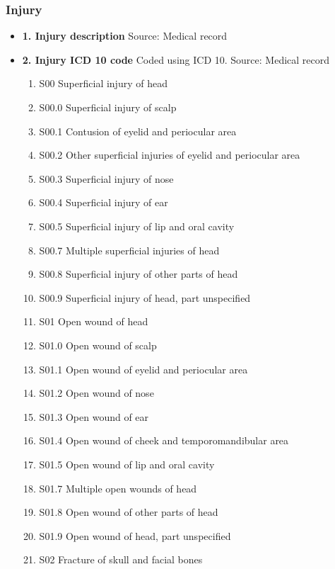 \documentclass[
]{scrartcl}
\providecommand{\tightlist}{%
  \setlength{\itemsep}{0pt}\setlength{\parskip}{0pt}}\usepackage{longtable,booktabs,array}
\begin{document}
\hypertarget{injury}{%
\subsubsection{Injury}\label{injury}}

\begin{itemize}
\item
  \textbf{1. Injury description} Source: Medical record
\item
  \textbf{2. Injury ICD 10 code} Coded using ICD 10. Source: Medical
  record

  \begin{enumerate}
  \def\labelenumi{\arabic{enumi}.}
  \tightlist
  \item
    S00 Superficial injury of head
  \item
    S00.0 Superficial injury of scalp
  \item
    S00.1 Contusion of eyelid and periocular area
  \item
    S00.2 Other superficial injuries of eyelid and periocular area
  \item
    S00.3 Superficial injury of nose
  \item
    S00.4 Superficial injury of ear
  \item
    S00.5 Superficial injury of lip and oral cavity
  \item
    S00.7 Multiple superficial injuries of head
  \item
    S00.8 Superficial injury of other parts of head
  \item
    S00.9 Superficial injury of head, part unspecified
  \item
    S01 Open wound of head
  \item
    S01.0 Open wound of scalp
  \item
    S01.1 Open wound of eyelid and periocular area
  \item
    S01.2 Open wound of nose
  \item
    S01.3 Open wound of ear
  \item
    S01.4 Open wound of cheek and temporomandibular area
  \item
    S01.5 Open wound of lip and oral cavity
  \item
    S01.7 Multiple open wounds of head
  \item
    S01.8 Open wound of other parts of head
  \item
    S01.9 Open wound of head, part unspecified
  \item
    S02 Fracture of skull and facial bones

\end{enumerate}
\end{itemize}
\end{document}
